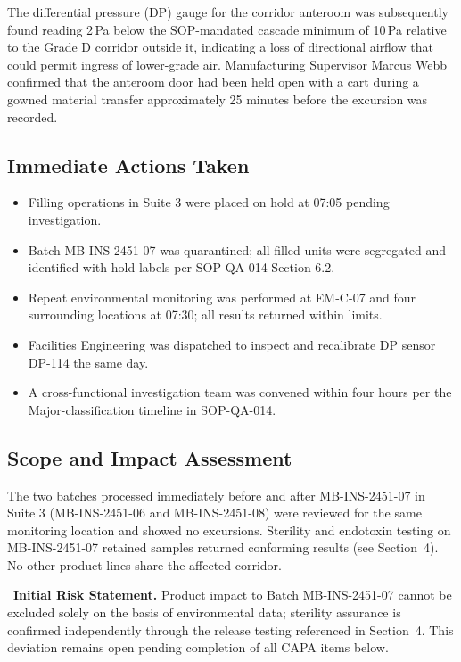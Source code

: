 The differential pressure (DP) gauge for the corridor anteroom was subsequently found
reading 2\,Pa below the SOP-mandated cascade minimum of 10\,Pa relative to the Grade D
corridor outside it, indicating a loss of directional airflow that could permit ingress
of lower-grade air. Manufacturing Supervisor Marcus Webb confirmed that the anteroom
door had been held open with a cart during a gowned material transfer approximately
25 minutes before the excursion was recorded.

\subsection{Immediate Actions Taken}

\begin{itemize}
  \item Filling operations in Suite 3 were placed on hold at 07:05 pending investigation.
  \item Batch MB-INS-2451-07 was quarantined; all filled units were segregated and
        identified with hold labels per SOP-QA-014 Section 6.2.
  \item Repeat environmental monitoring was performed at EM-C-07 and four surrounding
        locations at 07:30; all results returned within limits.
  \item Facilities Engineering was dispatched to inspect and recalibrate DP sensor
        DP-114 the same day.
  \item A cross-functional investigation team was convened within four hours per the
        Major-classification timeline in SOP-QA-014.
\end{itemize}

\subsection{Scope and Impact Assessment}

The two batches processed immediately before and after MB-INS-2451-07 in Suite 3
(MB-INS-2451-06 and MB-INS-2451-08) were reviewed for the same monitoring location and
showed no excursions. Sterility and endotoxin testing on MB-INS-2451-07 retained
samples returned conforming results (see Section~4). No other product lines share the
affected corridor.

\begin{tcolorbox}[warnbox]
\faExclamationTriangle\ \textbf{Initial Risk Statement.} Product impact to Batch
MB-INS-2451-07 cannot be excluded solely on the basis of environmental data; sterility
assurance is confirmed independently through the release testing referenced in
Section~4. This deviation remains open pending completion of all CAPA items below.
\end{tcolorbox}

